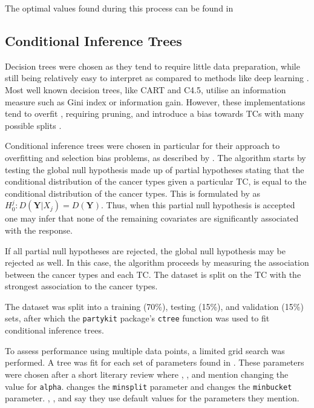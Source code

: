 The optimal values found during this process can be found in 





\subsection{Conditional Inference Trees}
Decision trees were chosen as they tend to require little data preparation, while still being relatively easy to interpret as compared to methods like deep learning \cite{ctree:trees_good}.
Most well known decision trees, like CART and C4.5, utilise an information measure such as Gini index or information gain.
However, these implementations tend to overfit \cite{ctree:overfit}, requiring pruning, and introduce a bias towards TCs with many possible splits \cite{ctree:bias}.

Conditional inference trees were chosen in particular for their approach to overfitting and selection bias problems, as described by \cite{ctree:art}.
The algorithm starts by testing the global null hypothesis made up of partial hypotheses stating that the conditional distribution of the cancer types given a particular TC, is equal to the conditional distribution of the cancer types.
This is formulated by \cite{ctree:art} as $H_0^j : D(\mathbf{Y}\vert X_j) = D(\mathbf{Y})$.
Thus, when this partial null hypothesis is accepted one may infer that none of the remaining covariates are significantly associated with the response.

If all partial null hypotheses are rejected, the global null hypothesis may be rejected as well.
In this case, the algorithm proceeds by measuring the association between the cancer types and each TC.
The dataset is split on the TC with the strongest association to the cancer types.

The dataset was split into a training (70\%), testing (15\%), and validation (15\%) sets, after which the \verb|partykit| package's \verb|ctree| function was used to fit conditional inference trees.

To assess performance using multiple data points, a limited grid search was performed.
A tree was fit for each set of parameters found in .
These parameters were chosen after a short literary review where \cite{gs:a}, \cite{gs:alpha2}, and \cite{gs:a_maxdepth} mention changing the value for \verb|alpha|.
\cite{gs:minsplit} changes the \verb|minsplit| parameter and \cite{gs:minbucket} changes the \verb|minbucket| parameter.
\cite{gs:def_bon}, \cite{gs:def_a_bon}, and \cite{gs:def_a_minsplit_minbucket} say they use default values for the parameters they mention.

